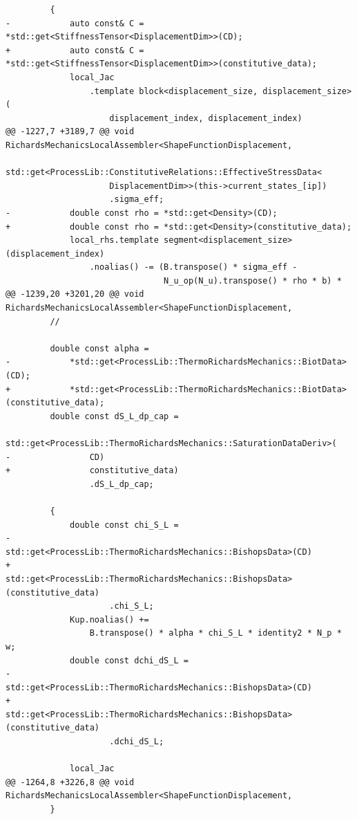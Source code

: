 \documentclass[10pt]{article}
\begin{document}
\begin{lstlisting}
         {
-            auto const& C = *std::get<StiffnessTensor<DisplacementDim>>(CD);
+            auto const& C = *std::get<StiffnessTensor<DisplacementDim>>(constitutive_data);
             local_Jac
                 .template block<displacement_size, displacement_size>(
                     displacement_index, displacement_index)
@@ -1227,7 +3189,7 @@ void RichardsMechanicsLocalAssembler<ShapeFunctionDisplacement,
                 std::get<ProcessLib::ConstitutiveRelations::EffectiveStressData<
                     DisplacementDim>>(this->current_states_[ip])
                     .sigma_eff;
-            double const rho = *std::get<Density>(CD);
+            double const rho = *std::get<Density>(constitutive_data);
             local_rhs.template segment<displacement_size>(displacement_index)
                 .noalias() -= (B.transpose() * sigma_eff -
                                N_u_op(N_u).transpose() * rho * b) *
@@ -1239,20 +3201,20 @@ void RichardsMechanicsLocalAssembler<ShapeFunctionDisplacement,
         //
 
         double const alpha =
-            *std::get<ProcessLib::ThermoRichardsMechanics::BiotData>(CD);
+            *std::get<ProcessLib::ThermoRichardsMechanics::BiotData>(constitutive_data);
         double const dS_L_dp_cap =
             std::get<ProcessLib::ThermoRichardsMechanics::SaturationDataDeriv>(
-                CD)
+                constitutive_data)
                 .dS_L_dp_cap;
 
         {
             double const chi_S_L =
-                std::get<ProcessLib::ThermoRichardsMechanics::BishopsData>(CD)
+                std::get<ProcessLib::ThermoRichardsMechanics::BishopsData>(constitutive_data)
                     .chi_S_L;
             Kup.noalias() +=
                 B.transpose() * alpha * chi_S_L * identity2 * N_p * w;
             double const dchi_dS_L =
-                std::get<ProcessLib::ThermoRichardsMechanics::BishopsData>(CD)
+                std::get<ProcessLib::ThermoRichardsMechanics::BishopsData>(constitutive_data)
                     .dchi_dS_L;
 
             local_Jac
@@ -1264,8 +3226,8 @@ void RichardsMechanicsLocalAssembler<ShapeFunctionDisplacement,
         }
 

\end{lstlisting}
\end{document}
